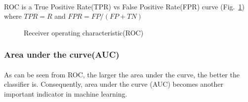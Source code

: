 \paragraph{}
ROC is a True Positive Rate(TPR) vs False Positive Rate(FPR) curve (Fig.~\ref{lr_fig:performance_roc}) where $TPR=R$ and $FPR=FP/(FP+TN)$
\begin{figure}[h!]
    \centering
    \caption{Receiver operating characteristic(ROC)}
    \label{lr_fig:performance_roc}
\end{figure}
%
\subsubsection{Area under the curve(AUC)}
\paragraph{}
As can be seen from ROC, the larger the area under the curve, the better the classifier is.
Consequently, area under the curve (AUC) becomes another important indicator in machine learning.